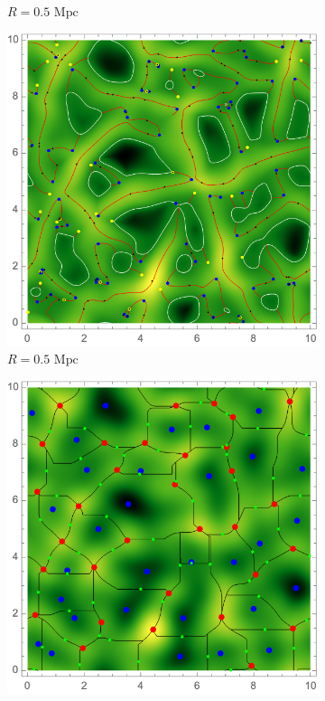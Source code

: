 \documentclass[a4paper, 11pt]{article}
\begin{document}
\begin{figure}
\begin{subfigure}[b]{0.3\textwidth}
\caption{$R=0.5\text{ Mpc}$}
\label{fig:}
\end{subfigure}
\begin{subfigure}[b]{0.3\textwidth}
\includegraphics[width=\textwidth]{ScaleR=050_skelet}
\caption{$R=0.5\text{ Mpc}$}
\label{fig:}
\end{subfigure}
\begin{subfigure}[b]{0.3\textwidth}
\includegraphics[width=\textwidth]{ScaleR=050_delta}

\end{subfigure}
\end{figure}
\end{document}
